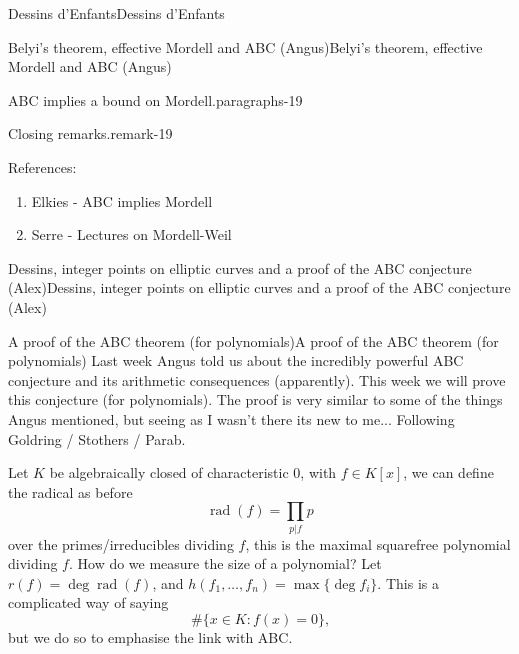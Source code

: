 \documentclass[10pt,]{book}
\numberwithin{equation}{section}
\newcommand{\lb}{[}
\newcommand{\rb}{]}
\begin{document}
\begin{chapterptx}{Dessins d'Enfants}{}{Dessins d'Enfants}{}{}
\begin{sectionptx}{Belyi's theorem, effective Mordell and ABC (Angus)}{}{Belyi's theorem, effective Mordell and ABC (Angus)}{}{}
\begin{paragraphs}{ABC implies a bound on Mordell.}{paragraphs-19}
\begin{remark}{Closing remarks.}{remark-19}
\end{remark}
\hypertarget{p-697}{}%
References:\leavevmode%
\begin{enumerate}
\item\hypertarget{li-148}{}Elkies - ABC implies Mordell%
\item\hypertarget{li-149}{}Serre - Lectures on Mordell-Weil%
\end{enumerate}
%
\end{paragraphs}%
\end{sectionptx}
%
%
\typeout{************************************************}
\typeout{************************************************}
%
\begin{sectionptx}{Dessins, integer points on elliptic curves and a proof of the ABC conjecture (Alex)}{}{Dessins, integer points on elliptic curves and a proof of the ABC conjecture (Alex)}{}{}\label{sec-dessins-integer-pts-abc}
%
%
\typeout{************************************************}
\typeout{************************************************}
%
\begin{subsectionptx}{A proof of the ABC theorem (for polynomials)}{}{A proof of the ABC theorem (for polynomials)}{}{}\label{subsection-62}
\hypertarget{p-698}{}%
Last week Angus told us about the incredibly powerful ABC conjecture and its arithmetic consequences (apparently). This week we will prove this conjecture (for polynomials). The proof is very similar to some of the things Angus mentioned, but seeing as I wasn't there its new to me... Following Goldring / Stothers / Parab.%
\par
\hypertarget{p-699}{}%
Let \(K\) be algebraically closed of characteristic 0, with \(f \in K\lb x \rb\), we can define the radical as before%
\begin{equation*}
\operatorname{rad}(f) = \prod_{p | f} p
\end{equation*}
over the primes/irreducibles dividing \(f\), this is the maximal squarefree polynomial dividing \(f\). How do we measure the size of a polynomial? Let \(r(f) = \deg \operatorname{rad}(f)\), and \(h(f_1, \ldots, f_n) = \max\{\deg f_i\}\). This is a complicated way of saying%
\begin{equation*}
\#\{x \in K : f(x) = 0 \}\text{,}
\end{equation*}
but we do so to emphasise the link with ABC.%
\par

\end{subsectionptx}
\end{sectionptx}
\end{chapterptx}
\end{document}
